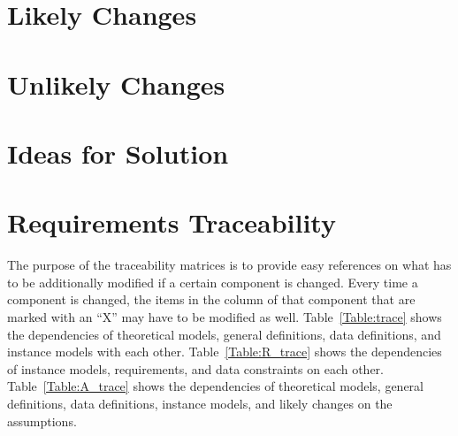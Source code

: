 \documentclass[12pt]{article}
\begin{document}
\section{Likely Changes}    

\section{Unlikely Changes}    

\section{Ideas for Solution}

\section{Requirements Traceability}

The purpose of the traceability matrices is to provide easy references on what
has to be additionally modified if a certain component is changed.  Every time a
component is changed, the items in the column of that component that are marked
with an ``X'' may have to be modified as well.  Table~\ref{Table:trace} shows the
dependencies of theoretical models, general definitions, data definitions, and
instance models with each other. Table~\ref{Table:R_trace} shows the
dependencies of instance models, requirements, and data constraints on each
other. Table~\ref{Table:A_trace} shows the dependencies of theoretical models,
general definitions, data definitions, instance models, and likely changes on
the assumptions.



\end{document}
